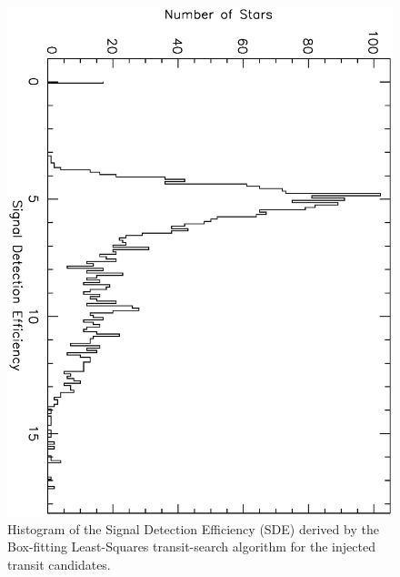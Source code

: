 \begin{figure}
\begin{center}
\centering
\includegraphics[width=.75\textwidth, angle=90]{7_comp_f}
\caption[Histogram of SDEs for BLS-recovered transit candidates]{%
Histogram of the Signal Detection Efficiency (SDE) derived by the Box-fitting Least-Squares transit-search algorithm for the injected transit candidates.%
}
\label{cha:human:sec:model:fig:histsderec}
\end{center}
\end{figure}
